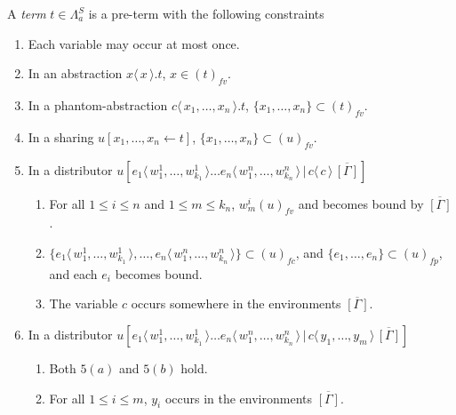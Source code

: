 \documentclass[a4paper,UKenglish,cleveref, autoref]{lipics-v2019}
\newcommand{\FALC}{\Lambda^{S}_{a}}
\newcommand{\fv}[1]{(#1)_{fv}}
\newcommand{\fp}[1]{(#1)_{fp}}
\newcommand{\fc}[1]{(#1)_{fc}}
\newcommand{\set}[1]{ \{ #1 \} }
\newcommand{\fake}[3]{#1 \langle \, #2 \, \rangle . #3}
\newcommand{\share}[3]{#1 [#2 \leftarrow #3]}
\newcommand{\dist}[5]{#1 [ #2 \, \vert \, \fakedist{#4}{#5} \, #3 ]}
\newcommand{\fakedist}[2]{#1 \langle \, #2 \, \rangle}
\begin{document}
\begin{definition}[Terms]
\label{def:falcterms}
A \emph{term} $t \in \FALC$ is a pre-term with the following constraints
\begin{enumerate}
	\item  Each variable may occur at most once.
	\item In an abstraction $\fake{x}{x}{t}$, $x \in \fv{t}$.
	\item In a phantom-abstraction $\fake{c}{x_{1}, \dots, x_{n}}{t}$, $\set{x_{1}, \dots, x_{n}} \subset \fv{t}$.
	\item  In a sharing $\share{u}{x_{1}, \dots, x_{n}}{t}$, $\set{x_{1}, \dots, x_{n}} \subset \fv{u}$.
	\item  In a distributor $\dist{u}{\fakedist{e_{1}}{w^{1}_{1}, \dots, w^{1}_{k_{1}}} \dots \fakedist{e_{n}}{w^{n}_{1}, \dots, w^{n}_{k_{n}}}}{\overline{[\Gamma]}}{c}{c}$
	\begin{enumerate}
		\item For all $1 \leq i \leq n$ and $1 \leq m \leq k_{n}$, $w^{i}_{m} \fv{u}$ and becomes bound by $\overline{[\Gamma]}$ .
		\item $\set{\fakedist{e_{1}}{w^{1}_{1}, \dots, w^{1}_{k_{1}}}, \dots, \fakedist{e_{n}}{w^{n}_{1}, \dots, w^{n}_{k_{n}}}} \subset \fc{u}$, and $\set{e_{1}, \dots, e_{n}} \subset \fp{u}$, and each $e_{i}$ becomes bound.
		\item The variable $c$ occurs somewhere in the environments $\overline{[\Gamma]}$.
	\end{enumerate}
	\item  In a distributor $\dist{u}{\fakedist{e_{1}}{w^{1}_{1}, \dots, w^{1}_{k_{1}}} \dots \fakedist{e_{n}}{w^{n}_{1}, \dots, w^{n}_{k_{n}}}}{\overline{[\Gamma]}}{c}{y_{1}, \dots, y_{m}}$
	\begin{enumerate}
		\item Both $5(a)$ and $5(b)$ hold.
		\item For all $1 \leq i \leq m$, $y_{i}$ occurs in the environments $\overline{[\Gamma]}$.
	\end{enumerate}
\end{enumerate}

\end{definition}
\end{document}
